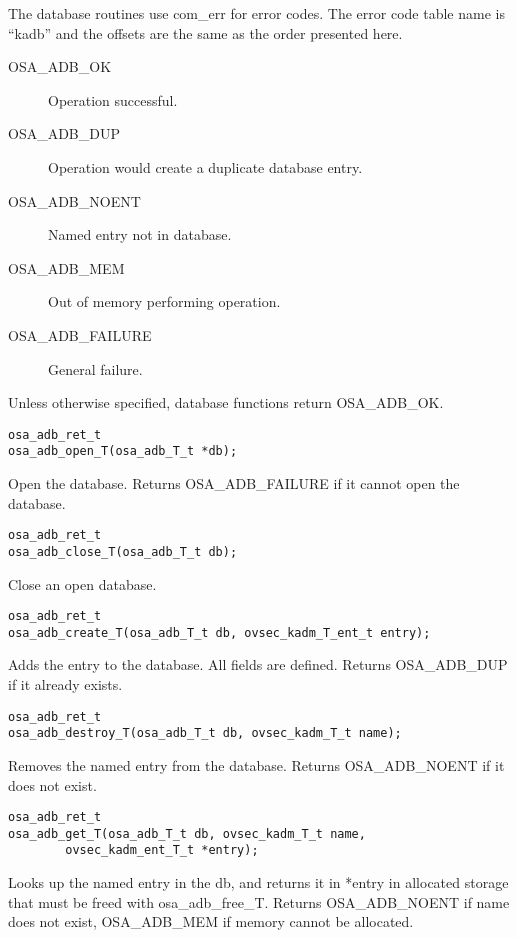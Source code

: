 The database routines use com_err for error codes.  The error code
table name is ``kadb'' and the offsets are the same as the order
presented here.

\begin{description}
\item[OSA_ADB_OK] Operation successful.
\item[OSA_ADB_DUP] Operation would create a duplicate database entry.
\item[OSA_ADB_NOENT] Named entry not in database.
\item[OSA_ADB_MEM] Out of memory performing operation.
\item[OSA_ADB_FAILURE] General failure.
\end{description}

Unless otherwise specified, database functions return OSA_ADB_OK.

\begin{verbatim}
osa_adb_ret_t
osa_adb_open_T(osa_adb_T_t *db);
\end{verbatim}
%
Open the database.  Returns OSA_ADB_FAILURE if it cannot open the
database. 

\begin{verbatim}
osa_adb_ret_t
osa_adb_close_T(osa_adb_T_t db);
\end{verbatim}
%
Close an open database.

\begin{verbatim}
osa_adb_ret_t
osa_adb_create_T(osa_adb_T_t db, ovsec_kadm_T_ent_t entry);
\end{verbatim}
%
Adds the entry to the database.  All fields are defined.  Returns
OSA_ADB_DUP if it already exists.

\begin{verbatim}
osa_adb_ret_t
osa_adb_destroy_T(osa_adb_T_t db, ovsec_kadm_T_t name);
\end{verbatim}

Removes the named entry from the database.  Returns OSA_ADB_NOENT if
it does not exist.

\begin{verbatim}
osa_adb_ret_t
osa_adb_get_T(osa_adb_T_t db, ovsec_kadm_T_t name,
        ovsec_kadm_ent_T_t *entry); 
\end{verbatim}

Looks up the named entry in the db, and returns it in *entry in
allocated storage that must be freed with osa_adb_free_T.  Returns
OSA_ADB_NOENT if name does not exist, OSA_ADB_MEM if memory cannot be
allocated.

